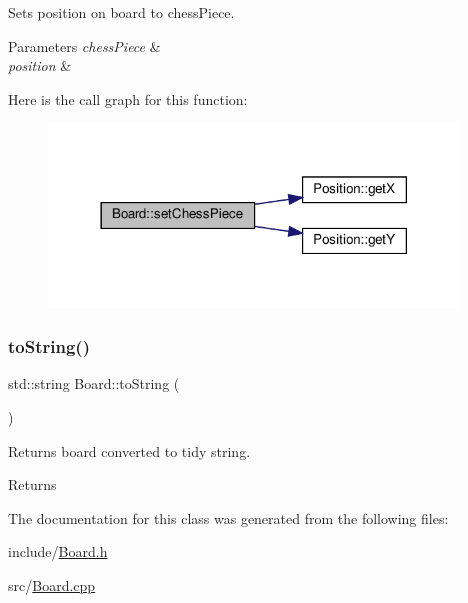 Sets position on board to chess\+Piece. 


\begin{DoxyParams}{Parameters}
{\em chess\+Piece} & \\
\hline
{\em position} & \\
\hline
\end{DoxyParams}
Here is the call graph for this function\+:\nopagebreak
\begin{figure}[H]
\begin{center}
\leavevmode
\includegraphics[width=309pt]{classBoard_aafb3a9f7f623360f66532e2f5fea0c2f_cgraph}
\end{center}
\end{figure}
\mbox{\label{classBoard_a2cf2b2f6adc453bc3b086c9f10c77e11}} 
\subsubsection{\texorpdfstring{to\+String()}{toString()}}
{\footnotesize\ttfamily std\+::string Board\+::to\+String (\begin{DoxyParamCaption}{ }\end{DoxyParamCaption})}



Returns board converted to tidy string. 

\begin{DoxyReturn}{Returns}

\end{DoxyReturn}


The documentation for this class was generated from the following files\+:\begin{DoxyCompactItemize}
\item 
include/\hyperlink{Board_8h}{Board.\+h}\item 
src/\hyperlink{Board_8cpp}{Board.\+cpp}\end{DoxyCompactItemize}
